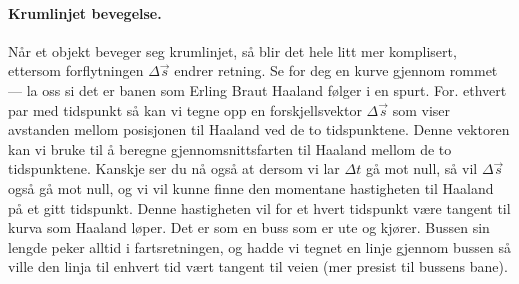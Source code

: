\paragraph{Krumlinjet bevegelse.} Når et objekt beveger seg krumlinjet, så blir det hele litt mer komplisert, ettersom forflytningen $\Delta \vec{s}$ endrer retning. Se for deg en kurve gjennom rommet — la oss si det er banen som Erling Braut Haaland følger i en spurt. For. ethvert par med tidspunkt så kan vi tegne opp en forskjellsvektor $\Delta\vec{s}$ som viser avstanden mellom posisjonen til Haaland ved de to tidspunktene. Denne vektoren kan vi bruke til å beregne gjennomsnittsfarten til Haaland mellom de to tidspunktene. Kanskje ser du nå også at dersom vi lar $\Delta t$ gå mot null, så vil $\Delta\vec{s}$ også gå mot null, og vi vil kunne finne den momentane hastigheten til Haaland på et gitt tidspunkt. Denne hastigheten vil for et hvert tidspunkt være tangent til kurva som Haaland løper. Det er som en buss som er ute og kjører. Bussen sin lengde peker alltid i fartsretningen, og hadde vi tegnet en linje gjennom bussen så ville den linja til enhvert tid vært tangent til veien (mer presist til bussens bane). 

